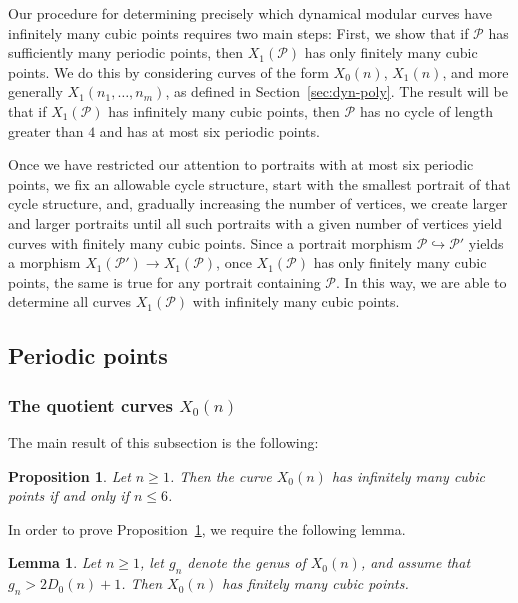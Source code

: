 \documentclass[12pt]{amsart}
\newtheorem{lem}[thm]{Lemma}
\newtheorem{prop}[thm]{Proposition}
\theoremstyle{definition}
\newcommand{\calP}{\mathcal{P}}
\numberwithin{equation}{section}
\begin{document}
Our procedure for determining precisely which dynamical modular curves have infinitely many cubic points requires two main steps: First, we show that if $\calP$ has sufficiently many periodic points, then $X_1(\calP)$ has only finitely many cubic points. We do this by considering curves of the form $X_0(n)$, $X_1(n)$, and more generally $X_1(n_1,\ldots,n_m)$, as defined in Section~\ref{sec:dyn-poly}. The result will be that if $X_1(\calP)$ has infinitely many cubic points, then $\calP$ has no cycle of length greater than $4$ and has at most six periodic points.

Once we have restricted our attention to portraits with at most six periodic points, we fix an allowable cycle structure, start with the smallest portrait of that cycle structure, and, gradually increasing the number of vertices, we create larger and larger portraits until all such portraits with a given number of vertices yield curves with finitely many cubic points. Since a portrait morphism $\calP \hookrightarrow \calP'$ yields a morphism $X_1(\calP') \to X_1(\calP)$, once $X_1(\calP)$ has only finitely many cubic points, the same is true for any portrait containing $\calP$. In this way, we are able to determine all curves $X_1(\calP)$ with infinitely many cubic points.

\subsection{Periodic points}

\subsubsection{The quotient curves $X_0(n)$}

The main result of this subsection is the following:

\begin{prop}\label{prop:X0(n)}
    Let $n \ge 1$. Then the curve $X_0(n)$ has infinitely many cubic points if and only if $n \le 6$.
\end{prop}

In order to prove Proposition~\ref{prop:X0(n)}, we require the following lemma.

\begin{lem}\label{lem:CS_X0}
    Let $n \ge 1$, let $g_n$ denote the genus of $X_0(n)$, and assume that $g_n > 2D_0(n) + 1$. Then $X_0(n)$ has finitely many cubic points.
\end{lem}
\end{document}
